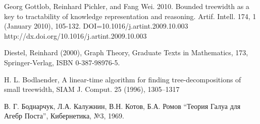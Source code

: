 \documentclass[12pt]{article}
\begin{document}
Georg Gottlob, Reinhard Pichler, and Fang Wei. 2010. Bounded treewidth as a key to tractability of knowledge representation and reasoning. Artif. Intell. 174, 1 (January 2010), 105-132. DOI=10.1016/j.artint.2009.10.003 http://dx.doi.org/10.1016/j.artint.2009.10.003

Diestel, Reinhard (2000), Graph Theory, Graduate Texts in Mathematics, 
173, Springer-Verlag, ISBN 0-387-98976-5.

H. L. Bodlaender, A linear-time algorithm for finding 
tree-decompositions of small
treewidth, SIAM J. Comput. 25 (1996), 1305–1317

В. Г. Боднарчук, Л.А. Калужнин, В.Н. Котов, Б.А. Ромов ``Теория Галуа для Агебр Поста'', Кибернетика, №3, 1969.

\endthebibliography
\end{document}
